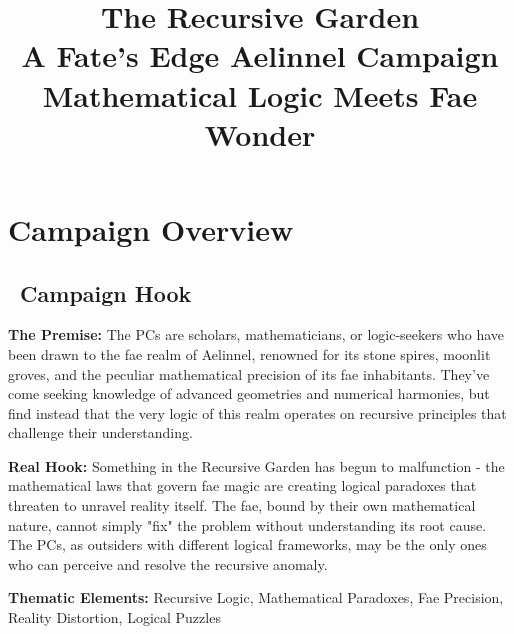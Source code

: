 \documentclass[11pt]{article}
\title{\Huge\textbf{The Recursive Garden}\\
\Large A Fate's Edge Aelinnel Campaign\\
\large Mathematical Logic Meets Fae Wonder}
\author{}
\date{}
\begin{document}
\maketitle

\begin{center}
\end{center}

\section{Campaign Overview}

\subsection*{\faMap\ Campaign Hook}

\textbf{The Premise:} The PCs are scholars, mathematicians, or logic-seekers who have been drawn to the fae realm of Aelinnel, renowned for its stone spires, moonlit groves, and the peculiar mathematical precision of its fae inhabitants. They've come seeking knowledge of advanced geometries and numerical harmonies, but find instead that the very logic of this realm operates on recursive principles that challenge their understanding.

\textbf{Real Hook:} Something in the Recursive Garden has begun to malfunction - the mathematical laws that govern fae magic are creating logical paradoxes that threaten to unravel reality itself. The fae, bound by their own mathematical nature, cannot simply "fix" the problem without understanding its root cause. The PCs, as outsiders with different logical frameworks, may be the only ones who can perceive and resolve the recursive anomaly.

\textbf{Thematic Elements:} Recursive Logic, Mathematical Paradoxes, Fae Precision, Reality Distortion, Logical Puzzles
\end{document}
